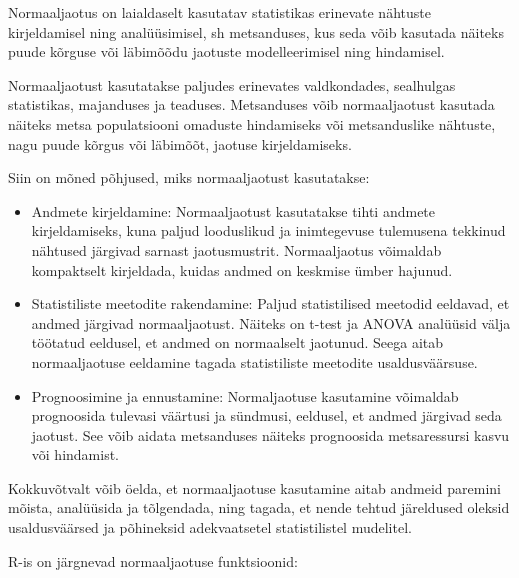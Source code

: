 \documentclass[
]{book}
\begin{document}
Normaaljaotus on laialdaselt kasutatav statistikas erinevate nähtuste kirjeldamisel ning analüüsimisel, sh metsanduses, kus seda võib kasutada näiteks puude kõrguse või läbimõõdu jaotuste modelleerimisel ning hindamisel.

Normaaljaotust kasutatakse paljudes erinevates valdkondades, sealhulgas statistikas, majanduses ja teaduses. Metsanduses võib normaaljaotust kasutada näiteks metsa populatsiooni omaduste hindamiseks või metsanduslike nähtuste, nagu puude kõrgus või läbimõõt, jaotuse kirjeldamiseks.

Siin on mõned põhjused, miks normaaljaotust kasutatakse:

\begin{itemize}
\item
  Andmete kirjeldamine: Normaaljaotust kasutatakse tihti andmete kirjeldamiseks, kuna paljud looduslikud ja inimtegevuse tulemusena tekkinud nähtused järgivad sarnast jaotusmustrit. Normaaljaotus võimaldab kompaktselt kirjeldada, kuidas andmed on keskmise ümber hajunud.
\item
  Statistiliste meetodite rakendamine: Paljud statistilised meetodid eeldavad, et andmed järgivad normaaljaotust. Näiteks on t-test ja ANOVA analüüsid välja töötatud eeldusel, et andmed on normaalselt jaotunud. Seega aitab normaaljaotuse eeldamine tagada statistiliste meetodite usaldusväärsuse.
\item
  Prognoosimine ja ennustamine: Normaljaotuse kasutamine võimaldab prognoosida tulevasi väärtusi ja sündmusi, eeldusel, et andmed järgivad seda jaotust. See võib aidata metsanduses näiteks prognoosida metsaressursi kasvu või hindamist.
\end{itemize}

Kokkuvõtvalt võib öelda, et normaaljaotuse kasutamine aitab andmeid paremini mõista, analüüsida ja tõlgendada, ning tagada, et nende tehtud järeldused oleksid usaldusväärsed ja põhineksid adekvaatsetel statistilistel mudelitel.

R-is on järgnevad normaaljaotuse funktsioonid:
\end{document}
